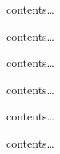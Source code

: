 \documentclass[
]{article}
\begin{document}
\begin{multicols}{3}

\begin{minipage}[b]{0.2\columnwidth}

contents\ldots{}

\end{minipage}\begin{minipage}[b]{0.8\columnwidth}

contents\ldots{}

\end{minipage}

\begin{minipage}[b]{0.2\columnwidth}

contents\ldots{}

\end{minipage}\begin{minipage}[b]{0.8\columnwidth}

contents\ldots{}

\end{minipage}

\begin{minipage}[b]{0.2\columnwidth}

contents\ldots{}

\end{minipage}\begin{minipage}[b]{0.8\columnwidth}

contents\ldots{}

\end{minipage}

\end{multicols}
\end{document}
